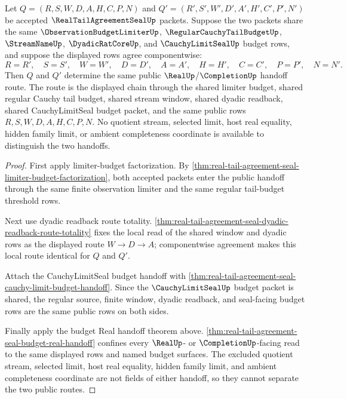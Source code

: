 \begin{theorem}
\label{thm:real-tail-agreement-seal-root-budget-route-determinacy}
Let $Q=(R,S,W,D,A,H,C,P,N)$ and $Q'=(R',S',W',D',A',H',C',P',N')$ be accepted $\RealTailAgreementSealUp$ packets. Suppose the two packets share the same $\ObservationBudgetLimiterUp$, $\RegularCauchyTailBudgetUp$, $\StreamNameUp$, $\DyadicRatCoreUp$, and $\CauchyLimitSealUp$ budget rows, and suppose the displayed rows agree componentwise:
$$
R=R',\quad S=S',\quad W=W',\quad D=D',\quad A=A',\quad H=H',\quad C=C',\quad P=P',\quad N=N'.
$$
Then $Q$ and $Q'$ determine the same public $\RealUp$/$\CompletionUp$ handoff route. The route is the displayed chain through the shared limiter budget, shared regular Cauchy tail budget, shared stream window, shared dyadic readback, shared CauchyLimitSeal budget packet, and the same public rows $R,S,W,D,A,H,C,P,N$. No quotient stream, selected limit, host real equality, hidden family limit, or ambient completeness coordinate is available to distinguish the two handoffs.
\end{theorem}
\begin{proof}
First apply limiter-budget factorization. By \autoref{thm:real-tail-agreement-seal-limiter-budget-factorization}, both accepted packets enter the public handoff through the same finite observation limiter and the same regular tail-budget threshold rows.

Next use dyadic readback route totality. \autoref{thm:real-tail-agreement-seal-dyadic-readback-route-totality} fixes the local read of the shared window and dyadic rows as the displayed route $W \to D \to A$; componentwise agreement makes this local route identical for $Q$ and $Q'$.

Attach the CauchyLimitSeal budget handoff with \autoref{thm:real-tail-agreement-seal-cauchy-limit-budget-handoff}. Since the $\CauchyLimitSealUp$ budget packet is shared, the regular source, finite window, dyadic readback, and seal-facing budget rows are the same public rows on both sides.

Finally apply the budget Real handoff theorem above. \autoref{thm:real-tail-agreement-seal-budget-real-handoff} confines every $\RealUp$- or $\CompletionUp$-facing read to the same displayed rows and named budget surfaces. The excluded quotient stream, selected limit, host real equality, hidden family limit, and ambient completeness coordinate are not fields of either handoff, so they cannot separate the two public routes.
\end{proof}

